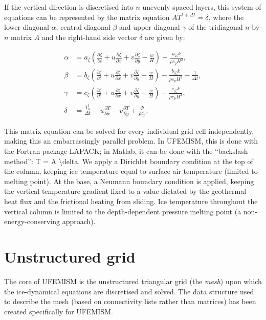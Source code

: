 \documentclass{article}
\begin{document}
If the vertical direction is discretised into $n$ unevenly spaced layers, this system of equations can be represented by the matrix equation $A T^{t+\Delta t} = \delta$, where the lower diagonal $\alpha$, central diagonal $\beta$ and upper diagonal $\gamma$ of the tridiagonal $n$-by-$n$ matrix $A$ and the right-hand side vector $\delta$ are given by:

\begin{align}
\alpha &= a_{\zeta} \left( \frac{\partial \zeta}{\partial t} + u \frac{\partial \zeta}{\partial x} + v \frac{\partial \zeta}{\partial y} - \frac{w}{H} \right) - \frac{a_{\zeta \zeta} k}{\rho c_p H^2}, \\
\beta &= b_{\zeta} \left( \frac{\partial \zeta}{\partial t} + u \frac{\partial \zeta}{\partial x} + v \frac{\partial \zeta}{\partial y} - \frac{w}{H} \right) - \frac{b_{\zeta \zeta} k}{\rho c_p H^2} - \frac{1}{\Delta t}, \\
\gamma &= c_{\zeta} \left( \frac{\partial \zeta}{\partial t} + u \frac{\partial \zeta}{\partial x} + v \frac{\partial \zeta}{\partial y} - \frac{w}{H} \right) - \frac{c_{\zeta \zeta} k}{\rho c_p H^2}, \\
\delta &= \frac{T_k^t}{\Delta t} - u \frac{\partial T}{\partial x} - v \frac{\partial T}{\partial y} + \frac{\Phi}{\rho c_p}.
\end{align}

This matrix equation can be solved for every individual grid cell independently, making this an embarrassingly parallel problem. In UFEMISM, this is done with the Fortran package LAPACK; in Matlab, it can be done with the “backslash method”: T = A \textbackslash delta. We apply a Dirichlet boundary condition at the top of the column, keeping ice temperature equal to surface air temperature (limited to melting point). At the base, a Neumann boundary condition is applied, keeping the vertical temperature gradient fixed to a value dictated by the geothermal heat flux and the frictional heating from sliding. Ice temperature throughout the vertical column is limited to the depth-dependent pressure melting point (a non-energy-conserving approach).

\newpage
\section{Unstructured grid}

The core of UFEMISM is the unstructured triangular grid (the \emph{mesh}) upon which the ice-dynamical equations are discretised and solved. The data structure used
to describe the mesh (based on connectivity lists rather than matrices) has been created specifically for UFEMISM.
\end{document}

